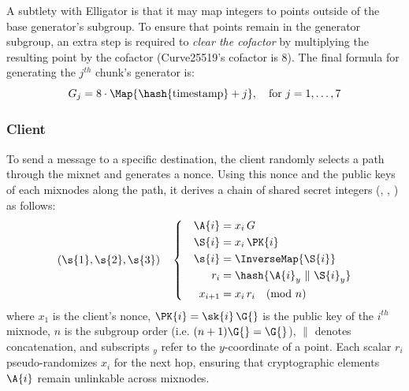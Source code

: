 A subtlety with Elligator is that it may map integers to points outside of the base generator's subgroup.
To ensure that points remain in the generator subgroup, an extra step is required to \textit{clear the cofactor} by multiplying the resulting point by the cofactor (Curve25519's cofactor is $ 8 $).
The final formula for generating the $ j^{th} $ chunk's generator is:
\begin{equation}
G_j = 8 \cdot \Map{\hash{\text{timestamp}} + j}, \quad \text{for } j = 1, \dots, 7
\end{equation}


\subsubsection{Client}
  
To send a message to a specific destination, the client randomly selects a path through the mixnet and generates a nonce.
Using this nonce and the public keys of each mixnodes along the path, it derives a chain of shared secret integers (, , ) as follows:
\begin{equation}
(\s{1}, \s{2}, \s{3}) \quad \left\{ \quad
\begin{aligned}
    \A{i}    &= x_i \, G \\
    \S{i}    &= x_i \, \PK{i} \\
    \s{i}    &= \InverseMap{\S{i}} \\
    r_i      &= \hash{{\A{i}}_y \ \| \ {\S{i}}_y} \\
    x_{i+1}  &= x_i \, r_i \quad (\text{mod}\ n)
\end{aligned}
\right.
\label{eq:shared_secret}
\end{equation}
where $x_1$ is the client's nonce, $\PK{i} = \sk{i}\,\G{}$ is the public key of the $i^{th}$ mixnode, $n$ is the subgroup order (i.e. $(n+1)\G{} = \G{}$), $\|$ denotes concatenation, and subscripts $_y$ refer to the $y$-coordinate of a point. 
Each scalar $r_i$ pseudo-randomizes $x_i$ for the next hop, ensuring that cryptographic elements $\A{i}$ remain unlinkable across mixnodes.

